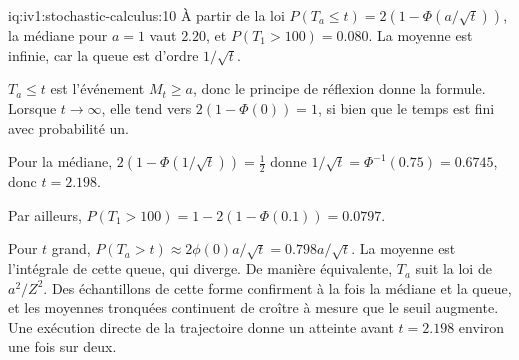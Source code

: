 \begin{solution}{iq:iv1:stochastic-calculus:10}
À partir de la loi $P(T_a \le t) = 2(1 - \Phi(a/\sqrt{t}))$, la médiane pour $a = 1$ vaut $2.20$, et $P(T_1 > 100) = 0.080$. La moyenne est infinie, car la queue est d'ordre $1/\sqrt{t}$.

$T_a \le t$ est l'événement $M_t \ge a$, donc le principe de réflexion donne la formule. Lorsque $t \to \infty$, elle tend vers $2(1 - \Phi(0)) = 1$, si bien que le temps est fini avec probabilité un.

Pour la médiane, $2(1 - \Phi(1/\sqrt{t})) = \frac12$ donne $1/\sqrt{t} = \Phi^{-1}(0.75) = 0.6745$, donc $t = 2.198$.

Par ailleurs, $P(T_1 > 100) = 1 - 2(1 - \Phi(0.1)) = 0.0797$.

Pour $t$ grand, $P(T_a > t) \approx 2\phi(0)a/\sqrt{t} = 0.798a/\sqrt{t}$. La moyenne est l'intégrale de cette queue, qui diverge. De manière équivalente, $T_a$ suit la loi de $a^2/Z^2$. Des échantillons de cette forme confirment à la fois la médiane et la queue, et les moyennes tronquées continuent de croître à mesure que le seuil augmente. Une exécution directe de la trajectoire donne un atteinte avant $t = 2.198$ environ une fois sur deux.



\end{solution}

